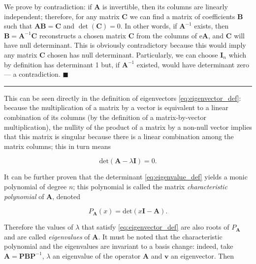 	We prove by contradiction: if $\mathbf{A}$ is invertible, then its columns are linearly independent; therefore, for any matrix $\mathbf{C}$ we can find a matrix of coefficients $\mathbf{B}$ such that $\mathbf{AB = C}$ and $\det\left(\mathbf{C}\right) = 0$. In other words, if $\mathbf{A}^{-1}$ exists, then $\mathbf{B} = \mathbf{A}^{-1}\mathbf{C}$ reconstructs a chosen matrix $\mathbf{C}$ from the columns of e$\mathbf{A}$, and $\mathbf{C}$ will have null determinant. This is obviously contradictory because this would imply any matrix $\mathbf{C}$ chosen has null determinant. Particularly, we can choose $\mathbf{I}_n$ which by definition has determinant 1 but, if $\mathbf{A}^{-1}$ existed, would have determinant zero — a contradiction.
\hfill$\blacksquare$
\vspace{5mm}
\hrule
\vspace{5mm} %

	This can be seen directly in the definition of eigenvectors \eqref{eq:eigenvector_def}: because the multiplication of a matrix by a vector is equivalent to a linear combination of its columns (by the definition of a matrix-by-vector multiplication), the nullity of the product of a matrix by a non-null vector implies that this matrix is singular because there is a linear combination among the matrix columns; this in turn means

\begin{equation} \text{det}\left(\mathbf{A} - \lambda\mathbf{I}\right) = 0. \label{eq:eigenvalue_def}\end{equation}

	It can be further proven that the determinant \eqref{eq:eigenvalue_def} yields a monic polynomial of degree $n$; this polynomial is called the matrix \textit{characteristic polynomial} of $\mathbf{A}$, denoted

\begin{equation} P_\mathbf{A} (x) = \text{det}\left(x\mathbf{I} - \mathbf{A}\right) .\end{equation}

	Therefore the values of $\lambda$ that satisfy \eqref{eq:eigenvector_def} are also roots of $P_\mathbf{A}$ and are called \textit{eigenvalues} of $\mathbf{A}$. It must be noted that the characteristic polynomial and the eigenvalues are invariant to a basis change: indeed, take $\mathbf{A} = \mathbf{PBP}^{-1}$, $\lambda$ an eigenvalue of the operator $\mathbf{A}$ and $\mathbf{v}$ an eigenvector. Then

